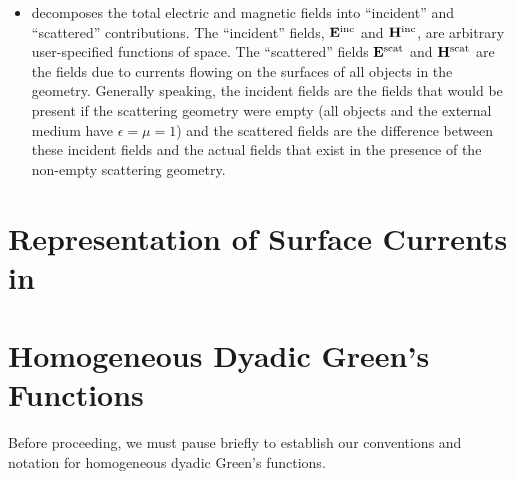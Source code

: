 \documentclass[letterpaper]{article}
\begin{document}
\begin{itemize}
\item
\lss decomposes the total electric and magnetic fields into 
``incident'' and ``scattered'' contributions. The ``incident'' 
fields, $\mathbf{E}^{\hbox{\scriptsize{inc}}}$ and $\mathbf{H}^{\hbox{\scriptsize{inc}}}$, 
are arbitrary user-specified functions of space.
The ``scattered'' fields $\mathbf{E}^{\hbox{\scriptsize{scat}}}$ and 
$\mathbf{H}^{\hbox{\scriptsize{scat}}}$ are the fields due to currents
flowing on the surfaces of all objects in the \lss geometry.
Generally speaking, the incident fields are the fields that
would be present if the scattering geometry were 
empty (all objects and the external medium have
$\epsilon=\mu=1$) and the scattered fields are the difference
between these incident fields and the actual fields that
exist in the presence of the non-empty scattering geometry. 

\end{itemize}

\newpage
\section{Representation of Surface Currents in \ls}

\newpage
\section{Homogeneous Dyadic Green's Functions}

Before proceeding, we must pause briefly to establish our 
conventions and notation for homogeneous dyadic Green's
functions.
\end{document}

